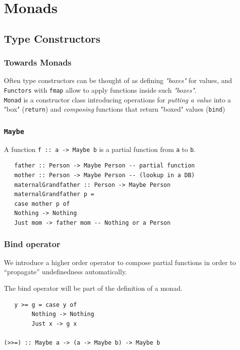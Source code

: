 \chapter{Monads}
\section{Type Constructors}

\subsection{Towards Monads}
Often type constructors can be thought of as
defining \textit{"boxes"} for values, and \lstinline|Functors| with \lstinline|fmap| allow to apply functions
inside such \textit{"boxes"}.\\
\lstinline|Monad| is a constructor class introducing
operations for \textit{putting a value} into a "box" (\lstinline|return|) and \textit{composing} functions that return "boxed" values (\lstinline|bind|)


\subsection{\texttt{Maybe}}
A function \lstinline|f :: a -> Maybe b| is a partial function from
\lstinline|a| to \lstinline|b|.
\begin{lstlisting}
   father :: Person -> Maybe Person -- partial function
   mother :: Person -> Maybe Person -- (lookup in a DB)
   maternalGrandfather :: Person -> Maybe Person
   maternalGrandfather p =
   case mother p of
   Nothing -> Nothing
   Just mom -> father mom -- Nothing or a Person
\end{lstlisting}

\subsection{Bind operator}


We introduce a higher order operator to
compose partial functions in order to
“propagate” undefinedness automatically.

The bind operator will be part of the definition
of a monad.

\begin{lstlisting}
   y >= g = case y of
        Nothing -> Nothing
        Just x -> g x

(>>=) :: Maybe a -> (a -> Maybe b) -> Maybe b
\end{lstlisting}

